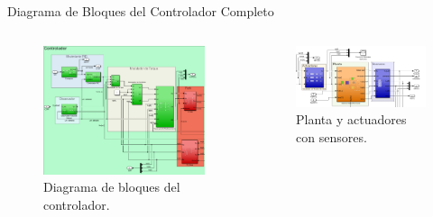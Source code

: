 \documentclass[12pt]{beamer}
\begin{document}
\begin{frame}{Diagrama de Bloques del Controlador Completo}
    \begin{columns}
        \begin{figure}
            \centering
            \includegraphics[width=\textwidth]{Imagenes/Controlador_Final.png}
            \caption{Diagrama de bloques del controlador.}
            \label{fig:Controlador_Final}
        \end{figure}

        \begin{figure}
            \centering
            \includegraphics[width=\textwidth]{Imagenes/Planta_Actuadores_Sensores_Final.png}
            \caption{Planta y actuadores con sensores.}
            \label{fig:Planta_Actuadores_Sensores_Final}
        \end{figure}
    \end{columns}
\end{frame}
\end{document}
